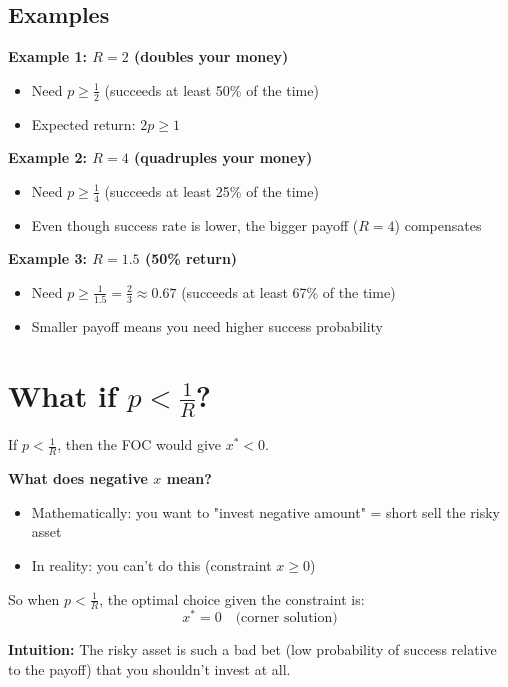 \documentclass[12pt]{article}
\begin{document}
\subsection*{Examples}

\textbf{Example 1: $R = 2$ (doubles your money)}
\begin{itemize}
\item Need $p \geq \frac{1}{2}$ (succeeds at least 50\% of the time)
\item Expected return: $2p \geq 1$
\end{itemize}

\textbf{Example 2: $R = 4$ (quadruples your money)}
\begin{itemize}
\item Need $p \geq \frac{1}{4}$ (succeeds at least 25\% of the time)
\item Even though success rate is lower, the bigger payoff ($R=4$) compensates
\end{itemize}

\textbf{Example 3: $R = 1.5$ (50\% return)}
\begin{itemize}
\item Need $p \geq \frac{1}{1.5} = \frac{2}{3} \approx 0.67$ (succeeds at least 67\% of the time)
\item Smaller payoff means you need higher success probability
\end{itemize}

\newpage

\section*{What if $p < \frac{1}{R}$?}

If $p < \frac{1}{R}$, then the FOC would give $x^* < 0$.

\textbf{What does negative $x$ mean?}
\begin{itemize}
\item Mathematically: you want to "invest negative amount" = short sell the risky asset
\item In reality: you can't do this (constraint $x \geq 0$)
\end{itemize}

So when $p < \frac{1}{R}$, the optimal choice given the constraint is:
\[
x^* = 0 \quad \text{(corner solution)}
\]

\textbf{Intuition:} The risky asset is such a bad bet (low probability of success relative to the payoff) that you shouldn't invest at all.
\end{document}
